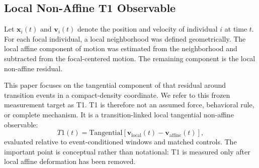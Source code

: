 \subsection{Local Non-Affine T1 Observable}

Let $\mathbf{x}_i(t)$ and $\mathbf{v}_i(t)$ denote the position and velocity of
individual $i$ at time $t$. For each focal individual, a local neighborhood was
defined geometrically. The local affine component of motion was estimated from
the neighborhood and subtracted from the focal-centered motion. The remaining
component is the local non-affine residual.

This paper focuses on the tangential component of that residual around
transition events in a compact-density coordinate. We refer to this frozen
measurement target as T1. T1 is therefore not an assumed force, behavioral
rule, or complete mechanism. It is a transition-linked local tangential
non-affine observable:
\begin{equation}
T1(t)
=
\mathrm{Tangential}
\left[
\mathbf{v}_{\mathrm{local}}(t)
-
\mathbf{v}_{\mathrm{affine}}(t)
\right],
\end{equation}
evaluated relative to event-conditioned windows and matched controls. The
important point is conceptual rather than notational: T1 is measured only after
local affine deformation has been removed.

